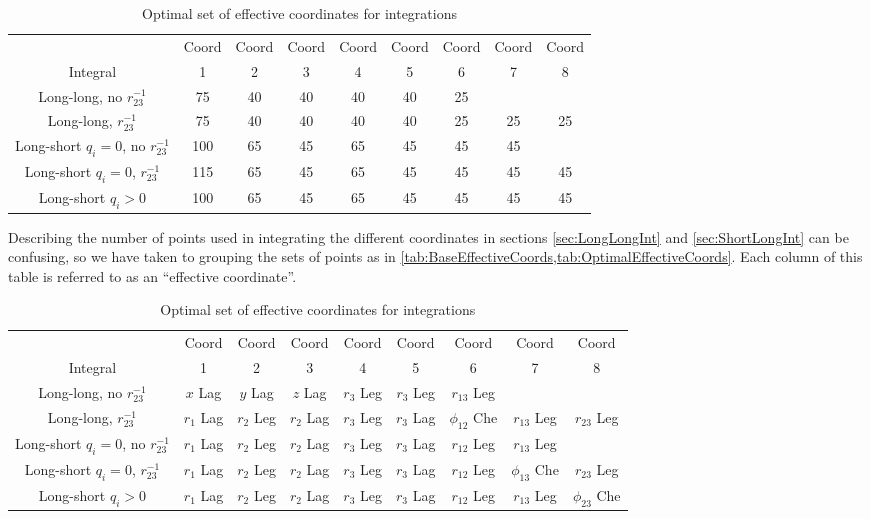 \documentclass[Dissertation.tex]{subfiles}
\begin{document}
\begin{table}[H]
\centering
\footnotesize
\begin{tabular}{c c c c c c c c c}
\toprule
 & Coord & Coord & Coord & Coord & Coord & Coord & Coord & Coord\\
Integral & 1 & 2 & 3 & 4 & 5 & 6 & 7 & 8 \\
\midrule
 Long-long, no $r_{23}^{-1}$			&  75 & 40 & 40 & 40 & 40 & 25 & & \\
 Long-long, $r_{23}^{-1}$				&  75 & 40 & 40 & 40 & 40 & 25 & 25 & 25 \\
\midrule
 Long-short $q_i = 0$, no $r_{23}^{-1}$	& 100 & 65 & 45 & 65 & 45 & 45 & 45 & \\
 Long-short $q_i = 0$, $r_{23}^{-1}$	& 115 & 65 & 45 & 65 & 45 & 45 & 45 & 45 \\
 Long-short $q_i > 0$					& 100 & 65 & 45 & 65 & 45 & 45 & 45 & 45 \\
\bottomrule
\end{tabular}
\caption{Optimal set of effective coordinates for integrations}
\label{tab:OptimalEffectiveCoords}
\end{table}

Describing the number of points used in integrating the different coordinates 
in sections \ref{sec:LongLongInt} and \ref{sec:ShortLongInt} can be 
confusing, so we have taken to grouping the sets of points as in
\cref{tab:BaseEffectiveCoords,tab:OptimalEffectiveCoords}. Each column of 
this table is referred to as an ``effective coordinate''.

\begin{table}[H]
\centering
\footnotesize
\begin{tabular}{c c c c c c c c c}
\toprule
 & Coord & Coord & Coord & Coord & Coord & Coord & Coord & Coord \\
Integral & 1 & 2 & 3 & 4 & 5 & 6 & 7 & 8 \\
\midrule
 Long-long, no $r_{23}^{-1}$ & $x$ Lag & $y$ Lag & $z$ Lag & $r_3$ Leg & $r_3$ Leg & $r_{13}$ Leg & & \\
 Long-long, $r_{23}^{-1}$ & $r_1$ Lag & $r_2$ Leg & $r_2$ Lag & $r_3$ Leg & $r_3$ Lag & $\phi_{12}$ Che & $r_{13}$ Leg & $r_{23}$ Leg \\
\midrule
 Long-short $q_i = 0$, no $r_{23}^{-1}$ & $r_1$ Lag & $r_2$ Leg & $r_2$ Lag & $r_3$ Leg & $r_3$ Lag & $r_{12}$ Leg & $r_{13}$ Leg & \\
 Long-short $q_i = 0$, $r_{23}^{-1}$ & $r_1$ Lag & $r_2$ Leg & $r_2$ Lag & $r_3$ Leg & $r_3$ Lag & $r_{12}$ Leg & $\phi_{13}$ Che & $r_{23}$ Leg \\
 Long-short $q_i > 0$ & $r_1$ Lag & $r_2$ Leg & $r_2$ Lag & $r_3$ Leg & $r_3$ Lag & $r_{12}$ Leg & $r_{13}$ Leg & $\phi_{23}$ Che \\
\bottomrule
\end{tabular}
\caption{Optimal set of effective coordinates for integrations}
\label{tab:EffectiveCoords}
\end{table}
\end{document}
